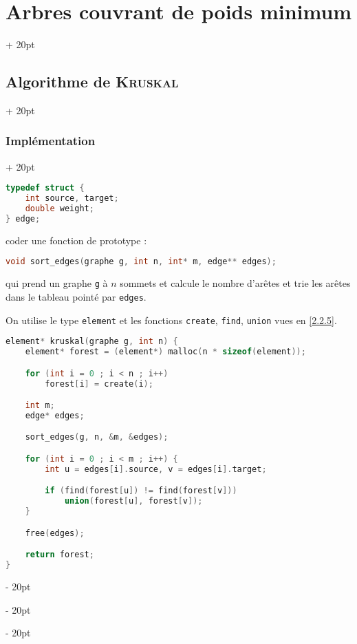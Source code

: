 \documentclass[a4paper, 12pt, twoside]{article}
\newcommand{\ind}[1][20pt]{\advance\leftskip + #1}
\newcommand{\deind}[1][20pt]{\advance\leftskip - #1}
\newenvironment{indt}[2][20pt]{#2 \par \ind[#1]}{\par \deind} %
\begin{document}
\begin{indt}{\section{Arbres couvrant de poids minimum}}
\begin{indt}{\subsection{Algorithme de \textsc{Kruskal}}}
\begin{indt}{\subsubsection{Implémentation}}
\begin{lstlisting}[language=C, xleftmargin=80pt]
typedef struct {
    int source, target;
    double weight;
} edge;\end{lstlisting}

                \vspace{12pt}
                
                 coder une fonction de prototype :
                \begin{lstlisting}[language=C, xleftmargin=80pt]
void sort_edges(graphe g, int n, int* m, edge** edges);\end{lstlisting}

                qui prend un graphe \texttt g à $n$ sommets et calcule le nombre d'arêtes et trie les arêtes dans le tableau pointé par \texttt{edges}.

                On utilise le type \texttt{element} et les fonctions \texttt{create}, \texttt{find}, \texttt{union} vues en \ref{2.2.5}.

                \begin{lstlisting}[language=C, xleftmargin=80pt]
element* kruskal(graphe g, int n) {
    element* forest = (element*) malloc(n * sizeof(element));

    for (int i = 0 ; i < n ; i++)
        forest[i] = create(i);

    int m;
    edge* edges;

    sort_edges(g, n, &m, &edges);

    for (int i = 0 ; i < m ; i++) {
        int u = edges[i].source, v = edges[i].target;

        if (find(forest[u]) != find(forest[v]))
            union(forest[u], forest[v]);
    }

    free(edges);

    return forest;
}
                \end{lstlisting}
            \end{indt}
        \end{indt}
    \end{indt}

    \vspace{12pt}
    
\end{document}
